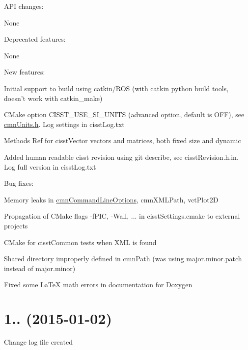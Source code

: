 \begin{DoxyItemize}
\item A\-P\-I changes\-:
\begin{DoxyItemize}
\item None
\end{DoxyItemize}
\item Deprecated features\-:
\begin{DoxyItemize}
\item None
\end{DoxyItemize}
\item New features\-:
\begin{DoxyItemize}
\item Initial support to build using catkin/\-R\-O\-S (with catkin python build tools, doesn't work with catkin\-\_\-make)
\item C\-Make option C\-I\-S\-S\-T\-\_\-\-U\-S\-E\-\_\-\-S\-I\-\_\-\-U\-N\-I\-T\-S (advanced option, default is O\-F\-F), see \hyperlink{cmn_units_8h}{cmn\-Units.\-h}. Log settings in cisst\-Log.\-txt
\item Methods Ref for cisst\-Vector vectors and matrices, both fixed size and dynamic
\item Added human readable cisst revision using git describe, see cisst\-Revision.\-h.\-in. Log full version in cisst\-Log.\-txt
\end{DoxyItemize}
\item Bug fixes\-:
\begin{DoxyItemize}
\item Memory leaks in \hyperlink{classcmn_command_line_options}{cmn\-Command\-Line\-Options}, cmn\-X\-M\-L\-Path, vct\-Plot2\-D
\item Propagation of C\-Make flags -\/f\-P\-I\-C, -\/\-Wall, ... in cisst\-Settings.\-cmake to external projects
\item C\-Make for cisst\-Common tests when X\-M\-L is found
\item Shared directory improperly defined in \hyperlink{classcmn_path}{cmn\-Path} (was using major.\-minor.\-patch instead of major.\-minor)
\item Fixed some La\-Te\-X math errors in documentation for Doxygen
\end{DoxyItemize}
\end{DoxyItemize}

\section*{1.. (2015-\/01-\/02) }


\begin{DoxyItemize}
\item Change log file created 
\end{DoxyItemize}